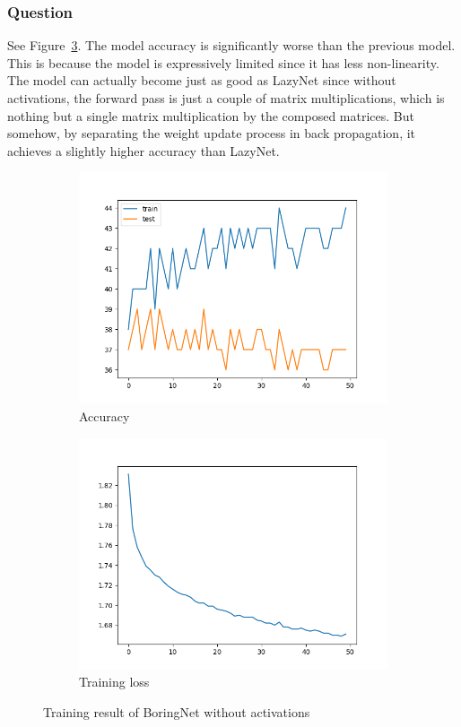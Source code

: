\documentclass[12pt]{article}
\begin{document}
\subsubsection{Question}
See Figure~\ref{fig:2_2_1}. The model accuracy is significantly worse than the previous model. This is because the model is expressively limited since it has less non-linearity. The model can actually become just as good as LazyNet since without activations, the forward pass is just a couple of matrix multiplications, which is nothing but a single matrix multiplication by the composed matrices. But somehow, by separating the weight update process in back propagation, it achieves a slightly higher accuracy than LazyNet.

\begin{figure}
  \centering
  \begin{subfigure}{.5\textwidth}
    \centering
    \includegraphics[width=.8\linewidth]{accuracies_2_2_1.png}
    \caption{Accuracy}
    \label{fig:2_2_1_sub1}
  \end{subfigure}%
  \begin{subfigure}{.5\textwidth}
    \centering
    \includegraphics[width=.8\linewidth]{loss_2_2_1.png}
    \caption{Training loss}
    \label{fig:2_2_1_sub2}
  \end{subfigure}
  \caption{Training result of BoringNet without activations}
  \label{fig:2_2_1}
\end{figure}
\end{document}
